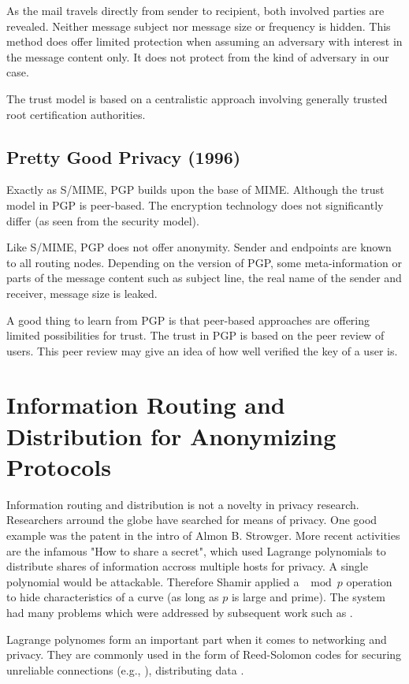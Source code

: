 As the mail travels directly from sender to recipient, both involved parties are revealed. Neither message subject nor message size or frequency is hidden. This method does offer limited protection when assuming an adversary with interest in the message content only. It does not protect from the kind of adversary in our case. 

The trust model is based on a centralistic approach involving generally trusted root certification authorities.

\section*{Pretty Good Privacy (1996)}
Exactly as S/MIME, PGP\cite{rfc4880} builds upon the base of MIME. Although the trust model in PGP is peer-based. The encryption technology does not significantly differ (as seen from the security model).

Like S/MIME, PGP does not offer anonymity. Sender and endpoints are known to all routing nodes. Depending on the version of PGP, some meta-information or parts of the message content such as subject line, the real name of the sender and receiver, message size is leaked.

A good thing to learn from PGP is that peer-based approaches are offering limited possibilities for trust. The trust in PGP is based on the peer review of users. This peer review may give an idea of how well verified the key of a user is.


\chapter{Information Routing and Distribution for Anonymizing Protocols}
Information routing and distribution is not a novelty in privacy research. Researchers arround the globe have searched for means of privacy.  One good example was the patent in the intro of Almon B. Strowger\cite{pulseDialingPatent}. More recent activities are the  infamous "How to share a secret"\cite{shamir1979share}, which used Lagrange polynomials to distribute shares of information accross multiple hosts for privacy. A single polynomial would be attackable. Therefore Shamir applied a $\mod p$ operation to hide characteristics of a curve (as long as $p$ is large and prime). The system had many problems which were addressed by subsequent work such as \cite{tompa1989share}.

Lagrange polynomes form an important part when it comes to networking and privacy. They are commonly used in the form of Reed-Solomon codes for securing unreliable connections (e.g., \cite{aiache2008reed}), distributing data \cite{shamir1979share}.

